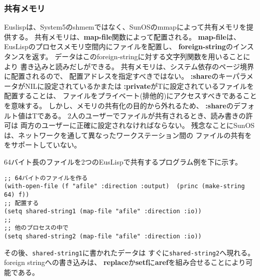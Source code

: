 \subsubsection{共有メモリ}
Euslispは、System5のshmemではなく、SunOSのmmapによって共有メモリを提供する。
共有メモリは、{\bf map-file}関数によって配置される。
{\bf map-file}は、EusLispのプロセスメモリ空間内にファイルを配置し、
{\bf foreign-string}のインスタンスを返す。
データはこのforeign-stringに対する文字列関数を用いることにより
書き込みと読みだしができる。
共有メモリは、システム依存のページ境界に配置されるので、 
配置アドレスを指定すべきではない。
{\bf :share}のキーパラメータがNILに設定されているかまたは
{\bf :private}がTに設定されているファイルを配置することは、
ファイルをプライベート(排他的)にアクセスすべきであることを意味する。
しかし、メモリの共有化の目的から外れるため、
{\bf :share}のデフォルト値はTである。
2人のユーザーでファイルが共有されるとき、読み書きの許可は
両方のユーザーに正確に設定されなければならない。
残念なことにSunOSは、ネットワークを通して異なったワークステーション間の
ファイルの共有ををサポートしていない。

64バイト長のファイルを2つのEusLispで共有するプログラム例を下に示す。

\begin{verbatim}
;; 64バイトのファイルを作る
(with-open-file (f "afile" :direction :output)  (princ (make-string 64) f))
;; 配置する
(setq shared-string1 (map-file "afile" :direction :io))
;;
;; 他のプロセスの中で
(setq shared-string2 (map-file "afile" :direction :io))
\end{verbatim}

その後、{\tt shared-string1}に書かれたデータは
すぐに{\tt shared-string2}へ現れる。
foreign stringへの書き込みは、
{\bf replace}か{\bf setf}に{\bf aref}を組み合せることにより可能である。

\begin{refdesc}

\end{refdesc}

